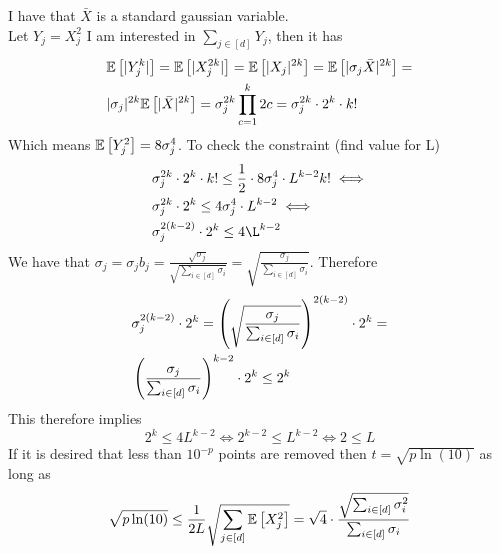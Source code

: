 \documentclass[a4paper,12pt]{article}
\begin{document}
I have that $\bar{X}$ is a standard gaussian variable. \\
Let $Y_j = X_j^2$ I am interested in $\sum_{j \in [d]} Y_j$,
then it has 
\begin{align*}
    &\mathbb{E} \left [  |Y_j^k|   \right] = \mathbb{E} \left [  |X_j^{2k}|   \right] = \mathbb{E} \left [  |X_j|^{2k}   \right] = 
    \mathbb{E} \left [  | \sigma_j \bar{X} |^{2k}   \right] = \\
    &| \sigma_j |^{2k} \mathbb{E} \left [  | \bar{X} |^{2k}  \right] = 
    \sigma_j ^{2k} \prod_{c=1}^k 2c = \sigma_j^{2k} \cdot 2^k \cdot k!
\end{align*}
Which means $\mathbb{E} \left [ Y_j^2  \right] = 8 \sigma_j^{4}$.
To check the constraint (find value for L)
\begin{align*}
    &\sigma_j^{2k} \cdot 2^k \cdot k! \le
    \frac{1}{2} \cdot 8 \sigma_j^{4} \cdot L^{k-2} k! \iff \\
    &\sigma_j^{2k} \cdot 2^k \le 4 \sigma_j^4 \cdot L^{k-2} \iff \\
    &\sigma_j^{2(k-2)} \cdot 2^k \le 4 \L^{k-2}
\end{align*}
We have that 
$\sigma_j = \sigma_j b_j = \frac{\sqrt{\sigma_j}}{\sqrt{\sum_{i \in [d]} \sigma_i}} = \sqrt{\frac{\sigma_j}{\sum_{i \in [d]} \sigma_i}}$.
Therefore
\begin{align*}
    &\sigma_j^{2(k-2)} \cdot 2^k  = 
    \left (\sqrt{\frac{\sigma_j}{\sum_{i \in [d]}\sigma_i}}\right)^{2(k-2)} \cdot 2^k = \\
    &\left (\frac{\sigma_j}{\sum_{i \in [d]}\sigma_i}\right)^{k-2} \cdot 2^k \le 2^k
\end{align*}
This therefore implies
\[
    2^k \le 4 L^{k-2} \iff
    2^{k-2} \le L^{k-2} \iff
    2 \le L
\]
If it is desired that less than $10^{-p}$ points are removed then 
$t = \sqrt{p \ln(10) }$ as long as 
\[
    \sqrt{p \ln(10)} \le \frac{1}{2L}\sqrt{\sum_{j \in [d]} \mathbb{E} \left [ X_j^2  \right]} 
    = \sqrt{4} \cdot \frac{\sqrt{\sum_{i \in [d]} \sigma_i^2}}{\sum_{i \in [d]} \sigma_i}
\] 
\end{document}
